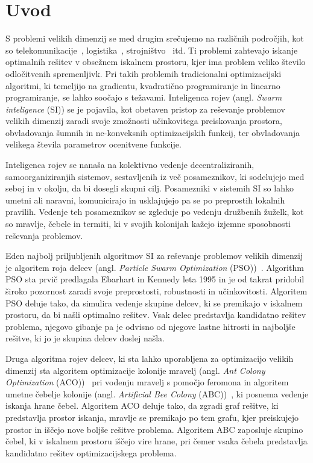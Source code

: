 \chapter{Uvod}\label{cahp:uvod}
S problemi velikih dimenzij se med drugim srečujemo na različnih področjih, kot so telekomunikacije~\cite{bib:lsgo:telecommunication}, logistika~\cite{bib:lsog:logistics}, strojništvo~\cite{bib:lsgo:engineering} itd.
Ti problemi zahtevajo iskanje optimalnih rešitev v obsežnem iskalnem prostoru, kjer ima problem veliko število odločitvenih spremenljivk.
Pri takih problemih tradicionalni optimizacijski algoritmi, ki temeljijo na gradientu, kvadratično programiranje in linearno programiranje, se lahko soočajo s težavami.
Inteligenca rojev (angl. \textit{Swarm inteligence} (SI)) se je pojavila, kot obetaven pristop za reševanje problemov velikih dimenzij zaradi svoje zmožnosti učinkovitega preiskovanja prostora, obvladovanja šumnih in ne-konveksnih optimizacijskih funkcij, ter obvladovanja velikega števila parametrov ocenitvene funkcije.

Inteligenca rojev se nanaša na kolektivno vedenje decentraliziranih, samoorganiziranjih sistemov, sestavljenih iz več posameznikov, ki sodelujejo med seboj in v okolju, da bi dosegli skupni cilj.
Posamezniki v sistemih SI so lahko umetni ali naravni, komunicirajo in usklajujejo pa se po preprostih lokalnih pravilih.
Vedenje teh posameznikov se zgleduje po vedenju družbenih žuželk, kot so mravlje, čebele in termiti, ki v svojih kolonijah kažejo izjemne sposobnosti reševanja problemov.

Eden najbolj priljubljenih algoritmov SI za reševanje problemov velikih dimenzij je algoritem roja delcev (angl. \textit{Particle Swarm Optimization} (PSO))~\cite{alg:pso}.
Algorithm PSO sta prvič predlagala Ebarhart in Kennedy leta 1995 in je od takrat pridobil široko pozornost zaradi svoje preprostosti, robustnosti in učinkovitosti.
Algoritem PSO deluje tako, da simulira vedenje skupine delcev, ki se premikajo v iskalnem prostoru, da bi našli optimalno rešitev.
Vsak delec predstavlja kandidatno rešitev problema, njegovo gibanje pa je odvisno od njegove lastne hitrosti in najboljše rešitve, ki jo je skupina delcev doslej našla.

Druga algoritma rojev delcev, ki sta lahko uporabljena za optimizacijo velikih dimenzij sta algoritem optimizacije kolonije mravelj (angl. \textit{Ant Colony Optimization} (ACO))~\cite{alg:aco} pri vodenju mravelj s pomočjo feromona in algoritem umetne čebelje kolonije (angl. \textit{Artificial Bee Colony} (ABC))~\cite{alg:abc}, ki posnema vedenje iskanja hrane čebel.
Algoritem ACO deluje tako, da zgradi graf rešitve, ki predstavlja prostor iskanja, mravlje se premikajo po tem grafu, kjer preiskujejo prostor in iščejo nove boljše rešitve problema.
Algoritem ABC zaposluje skupino čebel, ki v iskalnem prostoru iščejo vire hrane, pri čemer vsaka čebela predstavlja kandidatno rešitev optimizacijskega problema.

